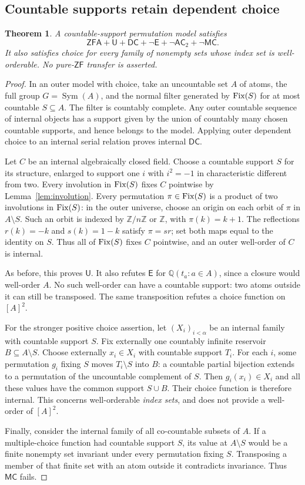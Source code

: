 \documentclass[11pt,a4paper]{article}
\newtheorem{theorem}{Theorem}[section]
\theoremstyle{definition}\newtheorem{definition}[theorem]{Definition}
\theoremstyle{remark}\newtheorem{remark}[theorem]{Remark}
\newcommand{\ZF}{\mathsf{ZF}}\newcommand{\ZFA}{\mathsf{ZFA}}
\newcommand{\E}{\mathsf E}\newcommand{\U}{\mathsf U}
\newcommand{\Q}{\mathbb Q}\newcommand{\F}{\mathbb F}
\begin{document}
\subsection{Countable supports retain dependent choice}
\begin{theorem}\label{thm:countablesupportu}
A countable-support permutation model satisfies
\[
\ZFA+\U+\mathsf{DC}+\neg\E+\neg\mathsf{AC}_2+\neg\mathsf{MC}.
\]
It also satisfies choice for every family of nonempty sets whose index set is well-orderable. No pure-$\ZF$ transfer is asserted.
\end{theorem}
\begin{proof}
In an outer model with choice, take an uncountable set $A$ of atoms, the full group $G=\operatorname{Sym}(A)$, and the normal filter generated by $\operatorname{Fix}(S)$ for at most countable $S\subseteq A$. The filter is countably complete. Any outer countable sequence of internal objects has a support given by the union of countably many chosen countable supports, and hence belongs to the model. Applying outer dependent choice to an internal serial relation proves internal $\mathsf{DC}$.

Let $C$ be an internal algebraically closed field. Choose a countable support $S$ for its structure, enlarged to support one $i$ with $i^2=-1$ in characteristic different from two. Every involution in $\operatorname{Fix}(S)$ fixes $C$ pointwise by Lemma~\ref{lem:involution}.
Every permutation $\pi\in\operatorname{Fix}(S)$ is a product of two involutions in $\operatorname{Fix}(S)$: in the outer universe, choose an origin on each orbit of $\pi$ in $A\setminus S$. Such an orbit is indexed by $\mathbb Z/n\mathbb Z$ or $\mathbb Z$, with $\pi(k)=k+1$. The reflections $r(k)=-k$ and $s(k)=1-k$ satisfy $\pi=sr$; set both maps equal to the identity on $S$. Thus all of $\operatorname{Fix}(S)$ fixes $C$ pointwise, and an outer well-order of $C$ is internal.

As before, this proves $\U$. It also refutes $\E$ for $\Q(t_a:a\in A)$, since a closure would well-order $A$. No such well-order can have a countable support: two atoms outside it can still be transposed. The same transposition refutes a choice function on $[A]^2$.

For the stronger positive choice assertion, let $(X_i)_{i<\alpha}$ be an internal family with countable support $S$. Fix externally one countably infinite reservoir $B\subseteq A\setminus S$. Choose externally $x_i\in X_i$ with countable support $T_i$. For each $i$, some permutation $g_i$ fixing $S$ moves $T_i\setminus S$ into $B$: a countable partial bijection extends to a permutation of the uncountable complement of $S$. Then $g_i(x_i)\in X_i$ and all these values have the common support $S\cup B$. Their choice function is therefore internal. This concerns well-orderable \emph{index sets}, and does not provide a well-order of $[A]^2$.

Finally, consider the internal family of all co-countable subsets of $A$. If a multiple-choice function had countable support $S$, its value at $A\setminus S$ would be a finite nonempty set invariant under every permutation fixing $S$. Transposing a member of that finite set with an atom outside it contradicts invariance. Thus $\mathsf{MC}$ fails.
\end{proof}
\end{document}
